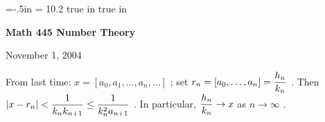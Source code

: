 \def\cmb{\MidnightBlue}	  %
\def\cnb{\NavyBlue}	  %
\def\crb{\RoyalBlue}	  %
\def\cce{\Cerulean}	  %
\def\ccy{\Cyan}		  %
\def\cpb{\ProcessBlue}	  %
\def\csb{\SkyBlue}	  %
\def\ctu{\Turquoise}	  %
\def\ctb{\TealBlue}	  %
\def\caq{\Aquamarine}	  %
\def\cbg{\BlueGreen}	  %
\def\cem{\Emerald}	  %
\def\cjg{\JungleGreen}	  %
\def\csg{\SeaGreen}	  %
\def\cgg{\Green}	  %
\def\cfg{\ForestGreen}	  %
\def\cpg{\PineGreen}	  %
\def\clg{\LimeGreen}	  %
\def\cyg{\YellowGreen}	  %
\def\cspg{\SpringGreen}	  %
\def\cog{\OliveGreen}	  %
\def\pars{\RawSienna}	  %
\def\cse{\Sepia}		  %
\def\cbr{\Brown}		  %
\def\cta{\Tan}		  %
\def\cgr{\Gray}		  %
\def\cbl{\Black}		  %
\def\cwh{\White}		  %



\voffset=1.2in
\hoffset=-.5in
\hsize = 10.2 true in
 true in

\overfullrule=0pt


\def\ctln{\centerline}
\def\u{\underbar}
\def\ssk{\smallskip}
\def\msk{\medskip}
\def\bsk{\bigskip}
\def\hsk{\hskip.1in}
\def\hhsk{\hskip.2in}
\def\dsl{\displaystyle}

\def\lra{$\Leftrightarrow$ }


\ctln{\bf Math 445 Number Theory}

\smallskip

\ctln{November 1, 2004}

\medskip

From last time: $x = [a_0,a_1,\ldots ,a_n,\ldots]$ ;  set $\dsl r_n = [a_0,\ldots , a_n] = {{h_n}\over{k_n}}$ .
Then $\dsl |x-r_n| < {{1}\over{k_n k_{n+1}}} \leq {{1}\over{k_n^2a_{n+1}}}$ . In particular, 
$\dsl {{h_n}\over{k_n}}\rightarrow x$ as $n\rightarrow \infty$ .

